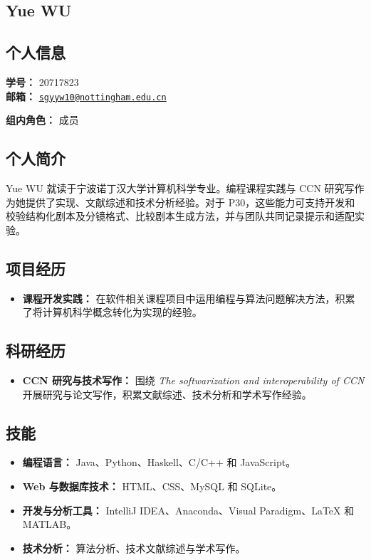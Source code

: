 \documentclass[a4paper,12pt]{article}
\newcommand{\PersonalInformation}[2]{%
  \subsection*{个人信息}
  \if\relax\detokenize{#1}\relax\else
  \noindent\textbf{学号：} #1\\
  \fi
  \textbf{邮箱：} #2\par
}
\begin{document}
\subsection{Yue WU}
\PersonalInformation{20717823}{\href{mailto:sgyyw10@nottingham.edu.cn}{\nolinkurl{sgyyw10@nottingham.edu.cn}}}
\noindent\textbf{组内角色：} 成员\par

\subsection*{个人简介}
Yue WU 就读于宁波诺丁汉大学计算机科学专业。编程课程实践与 CCN 研究写作为她提供了实现、文献综述和技术分析经验。对于 P30，这些能力可支持开发和校验结构化剧本及分镜格式、比较剧本生成方法，并与团队共同记录提示和适配实验。

\subsection*{项目经历}
\begin{itemize}
  \item \textbf{课程开发实践：} 在软件相关课程项目中运用编程与算法问题解决方法，积累了将计算机科学概念转化为实现的经验。
\end{itemize}

\subsection*{科研经历}
\begin{itemize}
  \item \textbf{CCN 研究与技术写作：} 围绕 \emph{The softwarization and interoperability of CCN} 开展研究与论文写作，积累文献综述、技术分析和学术写作经验。
\end{itemize}

\subsection*{技能}
\begin{itemize}
  \item \textbf{编程语言：} Java、Python、Haskell、C/C++ 和 JavaScript。
  \item \textbf{Web 与数据库技术：} HTML、CSS、MySQL 和 SQLite。
  \item \textbf{开发与分析工具：} IntelliJ IDEA、Anaconda、Visual Paradigm、LaTeX 和 MATLAB。
  \item \textbf{技术分析：} 算法分析、技术文献综述与学术写作。
\end{itemize}
\end{document}
